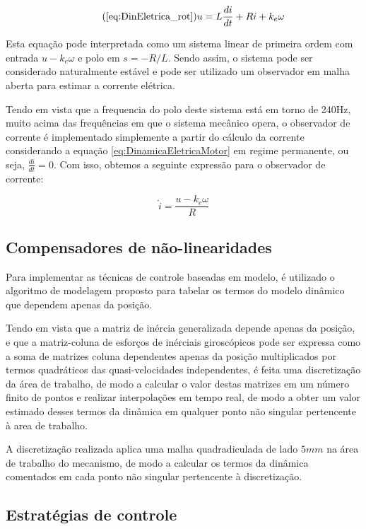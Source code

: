 \documentclass[]{politex}
\begin{document}
\begin{equation}
\tag{\ref{eq:DinEletrica_rot}} \label{eq:DinamicaEletricaMotor}
	   u = L \frac{di}{dt} + R i + k_{e} \omega
\end{equation}

Esta equação pode interpretada como um sistema linear de primeira ordem com entrada $u - k_{e} \omega $ e polo em $s = -R/L$. Sendo assim, o sistema pode ser considerado naturalmente estável e pode ser utilizado um observador em malha aberta para estimar a corrente elétrica.

Tendo em vista que a frequencia do polo deste sistema está em torno de 240Hz, muito acima das frequências em que o sistema mecânico opera, o observador de corrente é implementado simplemente a partir do cálculo da corrente considerando a equação \eqref{eq:DinamicaEletricaMotor} em regime permanente, ou seja, $\frac{di}{dt} = 0$. Com isso, obtemos a seguinte expressão para o observador de corrente:

\begin{equation}
\label{corrente}
\hat{i} = \frac{u - k_e \omega}{R}
\end{equation}

\subsection{Compensadores de não-linearidades}

Para implementar as técnicas de controle baseadas em modelo, é utilizado o algoritmo de modelagem proposto para tabelar os termos do modelo dinâmico que dependem apenas da posição.

Tendo em vista que a matriz de inércia generalizada depende apenas da posição, e que a matriz-coluna de esforços de inérciais giroscópicos pode ser expressa como a soma de matrizes coluna dependentes apenas da posição multiplicados por termos quadráticos das quasi-velocidades independentes, é feita uma discretização da área de trabalho, de modo a calcular o valor destas matrizes em um número finito de pontos e realizar interpolações em tempo real, de modo a obter um valor estimado desses termos da dinâmica em qualquer ponto não singular pertencente à area de trabalho.

A discretização realizada aplica uma malha quadradiculada de lado $5mm$ na área de trabalho do mecanismo, de modo a calcular os termos da dinâmica comentados em cada ponto não singular pertencente à discretização.

\subsection{Estratégias de controle}
\end{document}

